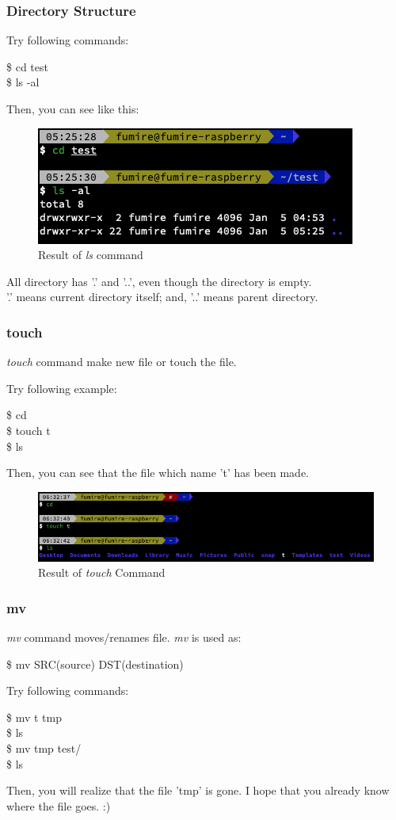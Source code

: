 \documentclass{beamer}
\begin{document}
	\begin{frame}
		\frametitle{Directory Structure}
		Try following commands:
		\begin{example}
			\$ cd test\\
			\$ ls -al
		\end{example}
		Then, you can see like this:
		\begin{figure}[h!]
			\centering
			\includegraphics[width=0.3 \linewidth]{figures/7.png}
			\caption{Result of \textit{ls} command}
		\end{figure}
		All directory has '.' and '..', even though the directory is empty. \\
		'.' means current directory itself; and, '..' means parent directory.
	\end{frame}

	\begin{frame}
		\frametitle{touch}
		\textit{touch} command make new file or touch the file.
		
		Try following example:
		\begin{example}
			\$ cd \\
			\$ touch t \\
			\$ ls
		\end{example}
		
		Then, you can see that the file which name 't' has been made. 
	
		\begin{figure}[h!]
			\centering
			\includegraphics[width=0.5 \linewidth]{figures/8.png}
			\caption{Result of \textit{touch} Command}
		\end{figure}
	\end{frame}

	\begin{frame}
		\frametitle{mv}
		\textit{mv} command moves/renames file. \textit{mv} is used as:
		\begin{example}
			\$ mv SRC(source) DST(destination)
		\end{example}
		
		Try following commands: 
		\begin{example}
			\$ mv t tmp \\
			\$ ls \\
			\$ mv tmp test/ \\
			\$ ls
		\end{example}
	
		Then, you will realize that the file 'tmp' is gone. I hope that you already know where the file goes. :)
	\end{frame}
\end{document}
